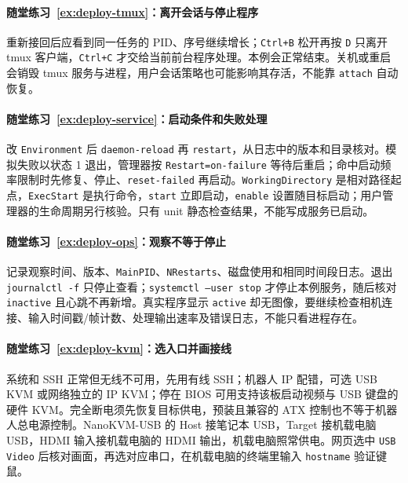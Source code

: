 \paragraph*{随堂练习~\ref{ex:deploy-tmux}：离开会话与停止程序}
\begin{solution}
重新接回后应看到同一任务的 PID、序号继续增长；\texttt{Ctrl+B} 松开再按 \texttt{D} 只离开 tmux 客户端，\texttt{Ctrl+C} 才交给当前前台程序处理。本例会正常结束。关机或重启会销毁 tmux 服务与进程，用户会话策略也可能影响其存活，不能靠 \texttt{attach} 自动恢复。
\end{solution}

\paragraph*{随堂练习~\ref{ex:deploy-service}：启动条件和失败处理}
\begin{solution}
改 \texttt{Environment} 后 \texttt{daemon-reload} 再 \texttt{restart}，从日志中的版本和目录核对。模拟失败以状态 1 退出，管理器按 \texttt{Restart=on-failure} 等待后重启；命中启动频率限制时先修复、停止、\texttt{reset-failed} 再启动。\texttt{WorkingDirectory} 是相对路径起点，\texttt{ExecStart} 是执行命令，\texttt{start} 立即启动，\texttt{enable} 设置随目标启动；用户管理器的生命周期另行核验。只有 unit 静态检查结果，不能写成服务已启动。
\end{solution}

\paragraph*{随堂练习~\ref{ex:deploy-ops}：观察不等于停止}
\begin{solution}
记录观察时间、版本、\texttt{MainPID}、\texttt{NRestarts}、磁盘使用和相同时间段日志。退出 \texttt{journalctl -f} 只停止查看；\texttt{systemctl --user stop} 才停止本例服务，随后核对 \texttt{inactive} 且心跳不再新增。真实程序显示 \texttt{active} 却无图像，要继续检查相机连接、输入时间戳/帧计数、处理输出速率及错误日志，不能只看进程存在。
\end{solution}

\paragraph*{随堂练习~\ref{ex:deploy-kvm}：选入口并画接线}
\begin{solution}
系统和 SSH 正常但无线不可用，先用有线 SSH；机器人 IP 配错，可选 USB KVM 或网络独立的 IP KVM；停在 BIOS 可用支持该板启动视频与 USB 键盘的硬件 KVM。完全断电须先恢复目标供电，预装且兼容的 ATX 控制也不等于机器人总电源控制。NanoKVM-USB 的 Host 接笔记本 USB，Target 接机载电脑 USB，HDMI 输入接机载电脑的 HDMI 输出，机载电脑照常供电。网页选中 \texttt{USB Video} 后核对画面，再选对应串口，在机载电脑的终端里输入 \texttt{hostname} 验证键鼠。
\end{solution}

